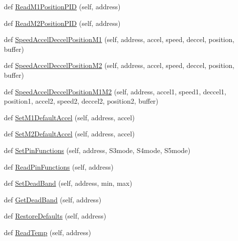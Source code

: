\begin{DoxyCompactItemize}
\item 
def \mbox{\hyperlink{classtoxic__hardware_1_1roboclaw__3_1_1Roboclaw_a8a5a872acaf7ced3a1d9c233b05cf888}{Read\+M1\+Position\+P\+ID}} (self, address)
\item 
def \mbox{\hyperlink{classtoxic__hardware_1_1roboclaw__3_1_1Roboclaw_ac6718bf05cbe1ff37b2b05b341459872}{Read\+M2\+Position\+P\+ID}} (self, address)
\item 
def \mbox{\hyperlink{classtoxic__hardware_1_1roboclaw__3_1_1Roboclaw_a1510dc6c5cbe0c390ec1e538d6090c0e}{Speed\+Accel\+Deccel\+Position\+M1}} (self, address, accel, speed, deccel, position, buffer)
\item 
def \mbox{\hyperlink{classtoxic__hardware_1_1roboclaw__3_1_1Roboclaw_a96c1f185e48895c26e6641574845ff26}{Speed\+Accel\+Deccel\+Position\+M2}} (self, address, accel, speed, deccel, position, buffer)
\item 
def \mbox{\hyperlink{classtoxic__hardware_1_1roboclaw__3_1_1Roboclaw_aa835c77821627c7563e526958234f449}{Speed\+Accel\+Deccel\+Position\+M1\+M2}} (self, address, accel1, speed1, deccel1, position1, accel2, speed2, deccel2, position2, buffer)
\item 
def \mbox{\hyperlink{classtoxic__hardware_1_1roboclaw__3_1_1Roboclaw_a5ae7220529d87348145fdabd3df72de0}{Set\+M1\+Default\+Accel}} (self, address, accel)
\item 
def \mbox{\hyperlink{classtoxic__hardware_1_1roboclaw__3_1_1Roboclaw_a661c32ff7926faf80aec24b03ae9bc9c}{Set\+M2\+Default\+Accel}} (self, address, accel)
\item 
def \mbox{\hyperlink{classtoxic__hardware_1_1roboclaw__3_1_1Roboclaw_ad962057c5f0a46776cd604dc8520733f}{Set\+Pin\+Functions}} (self, address, S3mode, S4mode, S5mode)
\item 
def \mbox{\hyperlink{classtoxic__hardware_1_1roboclaw__3_1_1Roboclaw_a183e44ddc340c26c333d3fa10146cdc3}{Read\+Pin\+Functions}} (self, address)
\item 
def \mbox{\hyperlink{classtoxic__hardware_1_1roboclaw__3_1_1Roboclaw_af71f79e6f601255b8c7139bd549d6495}{Set\+Dead\+Band}} (self, address, min, max)
\item 
def \mbox{\hyperlink{classtoxic__hardware_1_1roboclaw__3_1_1Roboclaw_ae455abe83fda6552bcc0ccabfeab39f6}{Get\+Dead\+Band}} (self, address)
\item 
def \mbox{\hyperlink{classtoxic__hardware_1_1roboclaw__3_1_1Roboclaw_ad7242cc93a8d1eaa0dab6b7607dda518}{Restore\+Defaults}} (self, address)
\item 
def \mbox{\hyperlink{classtoxic__hardware_1_1roboclaw__3_1_1Roboclaw_a85bd1deb23edd2d5167a374f4cf96ffe}{Read\+Temp}} (self, address)

\end{DoxyCompactItemize}
